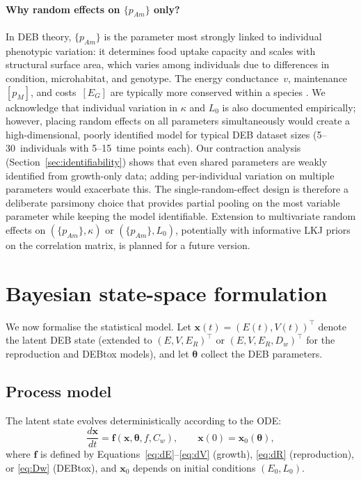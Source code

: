 \documentclass[article,shortnames]{jss}
\newcommand{\pAm}{\{p_{Am}\}}
\newcommand{\pM}{[p_M]}
\newcommand{\EG}{[E_G]}
\begin{document}
\paragraph{Why random effects on $\pAm$ only?}
In DEB theory, $\pAm$ is the parameter most strongly linked to
individual phenotypic variation: it determines food uptake capacity and
scales with structural surface area, which varies among individuals
due to differences in condition, microhabitat, and genotype.  The
energy conductance~$v$, maintenance~$\pM$, and costs~$\EG$ are
typically more conserved within a species \citep{Kooijman2010,
MarquesAmP2018}.  We acknowledge that individual variation in
$\kappa$ and $L_0$ is also documented empirically; however,
placing random effects on all parameters simultaneously would
create a high-dimensional, poorly identified model for typical DEB
dataset sizes (5--30~individuals with 5--15~time points each).
Our contraction analysis (Section~\ref{sec:identifiability}) shows
that even shared parameters are weakly identified from growth-only
data; adding per-individual variation on multiple parameters would
exacerbate this.  The single-random-effect design is therefore a
deliberate parsimony choice that provides partial pooling on the
most variable parameter while keeping the model identifiable.
Extension to multivariate random effects on $(\pAm, \kappa)$ or
$(\pAm, L_0)$, potentially with informative LKJ priors on the
correlation matrix, is planned for a future version.


\section{Bayesian state-space formulation} \label{sec:statespace}

We now formalise the statistical model.  Let
$\mathbf{x}(t) = (E(t), V(t))^\top$ denote the latent DEB state
(extended to $(E, V, E_R)^\top$ or $(E, V, E_R, D_w)^\top$
for the reproduction and DEBtox models), and let
$\boldsymbol{\theta}$ collect the DEB parameters.

\subsection{Process model}

The latent state evolves deterministically according to the ODE:
\begin{equation}
  \frac{d\mathbf{x}}{dt} = \mathbf{f}(\mathbf{x}, \boldsymbol{\theta},
  f, C_w), \qquad \mathbf{x}(0) = \mathbf{x}_0(\boldsymbol{\theta}),
  \label{eq:ode_general}
\end{equation}
where $\mathbf{f}$ is defined by
Equations~\eqref{eq:dE}--\eqref{eq:dV} (growth),
\eqref{eq:dR} (reproduction), or \eqref{eq:Dw} (DEBtox), and
$\mathbf{x}_0$ depends on initial conditions $(E_0, L_0)$.
\end{document}
